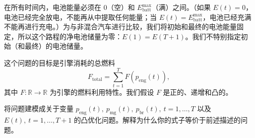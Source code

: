 \documentclass[UTF8,12pt,a4paper,fontset=fandol]{ctexart}
\begin{document}
在所有时间内，电池能量必须在 0（空）和 $E_{\mathrm{batt}}^{\max}$（满）之间。（如果 $E(t)=0$，电池已经完全放电，不能再从中提取任何能量；当 $E(t)=E_{\mathrm{batt}}^{\max}$，电池已经充满不能再进行充电。）为与非混合汽车进行比较，我们将初始和最终的电池能量固定，所以这个路程的净电池储量为零：$E(1)=E(T+1)$。我们不特别指定初始（和最终）的电池储量。

这个问题的目标是引擎消耗的总燃料
\[
F_{\mathrm{total}}=\sum_{t=1}^T F(p_{\mathrm{eng}}(t)),
\]
其中 $F:\mathbb{R}\to\mathbb{R}$ 为引擎的燃料利用特性。我们假设 $F$ 是正的、递增和凸的。

将问题建模成关于变量 $p_{\mathrm{eng}}(t),\ p_{\mathrm{mg}}(t),\ p_{\mathrm{br}}(t),\ t=1,\ldots,T$ 以及 $E(t),\ t=1,\ldots,T+1$ 的凸优化问题。解释为什么你的式子等价于前述描述的问题。
\end{document}

